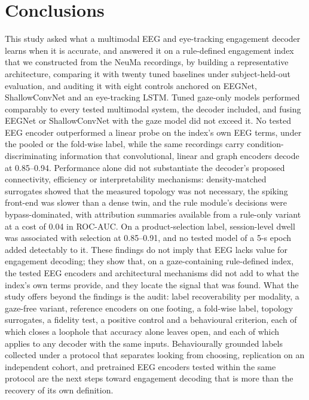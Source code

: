 \section{Conclusions}\label{sec:conclusion}

This study asked what a multimodal EEG and eye-tracking engagement decoder learns when it is accurate, and answered it on a rule-defined engagement index that we constructed from the NeuMa recordings, by building a representative architecture, comparing it with twenty tuned baselines under subject-held-out evaluation, and auditing it with eight controls anchored on EEGNet, ShallowConvNet and an eye-tracking LSTM. Tuned gaze-only models performed comparably to every tested multimodal system, the decoder included, and fusing EEGNet or ShallowConvNet with the gaze model did not exceed it. No tested EEG encoder outperformed a linear probe on the index's own EEG terms, under the pooled or the fold-wise label, while the same recordings carry condition-discriminating information that convolutional, linear and graph encoders decode at 0.85--0.94. Performance alone did not substantiate the decoder's proposed connectivity, efficiency or interpretability mechanisms: density-matched surrogates showed that the measured topology was not necessary, the spiking front-end was slower than a dense twin, and the rule module's decisions were bypass-dominated, with attribution summaries available from a rule-only variant at a cost of 0.04 in ROC-AUC. On a product-selection label, session-level dwell was associated with selection at 0.85--0.91, and no tested model of a 5-s epoch added detectably to it. These findings do not imply that EEG lacks value for engagement decoding; they show that, on a gaze-containing rule-defined index, the tested EEG encoders and architectural mechanisms did not add to what the index's own terms provide, and they locate the signal that was found. What the study offers beyond the findings is the audit: label recoverability per modality, a gaze-free variant, reference encoders on one footing, a fold-wise label, topology surrogates, a fidelity test, a positive control and a behavioural criterion, each of which closes a loophole that accuracy alone leaves open, and each of which applies to any decoder with the same inputs. Behaviourally grounded labels collected under a protocol that separates looking from choosing, replication on an independent cohort, and pretrained EEG encoders tested within the same protocol are the next steps toward engagement decoding that is more than the recovery of its own definition.
